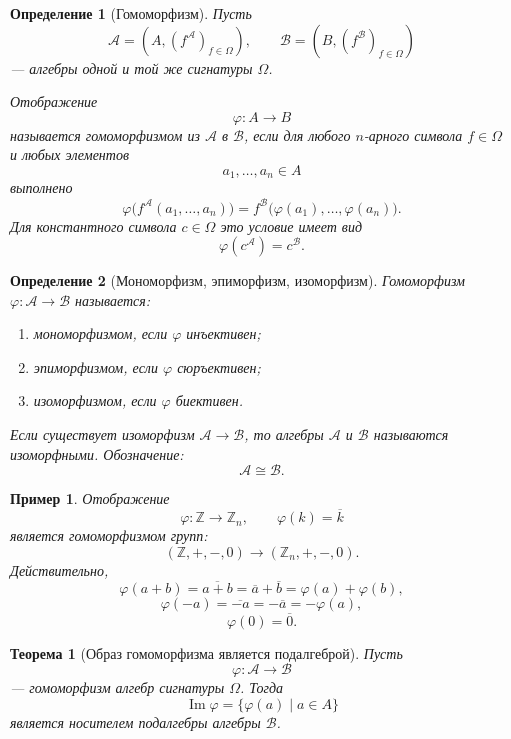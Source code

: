 \documentclass[12pt,a4paper]{article}
\newtheorem{definition}{Определение}
\newtheorem{theorem}{Теорема}
\newtheorem{example}{Пример}
\begin{document}
\begin{definition}[Гомоморфизм]
Пусть
\[
\mathcal A=(A,(f^{\mathcal A})_{f\in\Omega}),
\qquad
\mathcal B=(B,(f^{\mathcal B})_{f\in\Omega})
\]
--- алгебры одной и той же сигнатуры $\Omega$.

Отображение
\[
\varphi\colon A\to B
\]
называется \emph{гомоморфизмом} из $\mathcal A$ в $\mathcal B$, если для любого $n$-арного символа $f\in\Omega$ и любых элементов
\[
a_1,\dots,a_n\in A
\]
выполнено
\[
\varphi\bigl(f^{\mathcal A}(a_1,\dots,a_n)\bigr)
=
f^{\mathcal B}\bigl(\varphi(a_1),\dots,\varphi(a_n)\bigr).
\]
Для константного символа $c\in\Omega$ это условие имеет вид
\[
\varphi(c^{\mathcal A})=c^{\mathcal B}.
\]
\end{definition}

\begin{definition}[Мономорфизм, эпиморфизм, изоморфизм]
Гомоморфизм $\varphi\colon \mathcal A\to\mathcal B$ называется:
\begin{enumerate}
    \item \emph{мономорфизмом}, если $\varphi$ инъективен;
    \item \emph{эпиморфизмом}, если $\varphi$ сюръективен;
    \item \emph{изоморфизмом}, если $\varphi$ биективен.
\end{enumerate}

Если существует изоморфизм $\mathcal A\to\mathcal B$, то алгебры $\mathcal A$ и $\mathcal B$ называются \emph{изоморфными}. Обозначение:
\[
\mathcal A\cong\mathcal B.
\]
\end{definition}

\begin{example}
Отображение
\[
\varphi\colon \mathbb Z\to \mathbb Z_n,
\qquad
\varphi(k)=\overline{k}
\]
является гомоморфизмом групп:
\[
(\mathbb Z,+,-,0)\to(\mathbb Z_n,+,-,0).
\]
Действительно,
\[
\varphi(a+b)=\overline{a+b}=\overline a+\overline b=\varphi(a)+\varphi(b),
\]
\[
\varphi(-a)=\overline{-a}=-\overline a=-\varphi(a),
\]
\[
\varphi(0)=\overline 0.
\]
\end{example}

\begin{theorem}[Образ гомоморфизма является подалгеброй]
Пусть
\[
\varphi\colon \mathcal A\to\mathcal B
\]
--- гомоморфизм алгебр сигнатуры $\Omega$. Тогда
\[
\operatorname{Im}\varphi=\{\varphi(a)\mid a\in A\}
\]
является носителем подалгебры алгебры $\mathcal B$.
\end{theorem}
\end{document}
